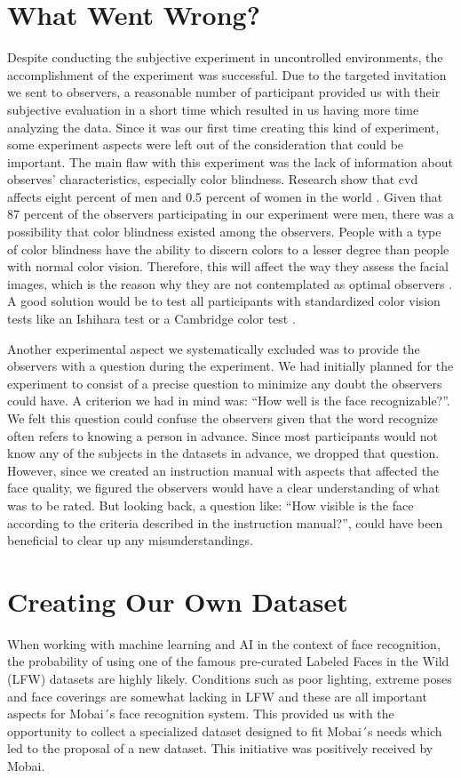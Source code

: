 \section{What Went Wrong?}
Despite conducting the subjective experiment in uncontrolled environments, the accomplishment of the experiment was successful. Due to the targeted invitation we sent to observers, a reasonable number of participant provided us with their subjective evaluation in a short time which resulted in us having more time analyzing the data. Since it was our first time creating this kind of experiment, some experiment aspects were left out of the consideration that could be important. The main flaw with this experiment was the lack of information about observes' characteristics, especially color blindness. Research show that \acrfull{cvd} affects eight percent of men and 0.5 percent of women in the world \cite{colorblindness}. Given that 87 percent of the observers participating in our experiment were men, there was a possibility that color blindness existed among the observers. People with a type of color blindness have the ability to discern colors to a lesser degree than people with normal color vision. Therefore, this will affect the way they assess the facial images, which is the reason why they are not contemplated as optimal observers \cite{Xphdthesis}. A good solution would be to test all participants with standardized color vision tests like an Ishihara test \cite{Ishihara} or a Cambridge color test \cite{CambridgeColorTest}.   

Another experimental aspect we systematically excluded was to provide the observers with a question during the experiment. We had initially planned for the experiment to consist of a precise question to minimize any doubt the observers could have. A criterion we had in mind was: ``How well is the face recognizable?''. We felt this question could confuse the observers given that the word recognize often refers to knowing a person in advance. Since most participants would not know any of the subjects in the datasets in advance, we dropped that question. However, since we created an instruction manual with aspects that affected the face quality, we figured the observers would have a clear understanding of what was to be rated. But looking back, a question like: ``How visible is the face according to the criteria described in the instruction manual?'', could have been beneficial to clear up any misunderstandings.   

\section{Creating Our Own Dataset}
\label{sec:ownData}
When working with machine learning and AI in the context of face recognition, the probability of using one of the famous pre-curated Labeled Faces in the Wild (LFW) datasets are highly likely. Conditions such as poor lighting, extreme poses and face coverings are somewhat lacking in LFW and these are all important aspects for Mobai´s face recognition system. This provided us with the opportunity to collect a specialized dataset designed to fit Mobai´s needs which led to the proposal of a new dataset. This initiative was positively received by Mobai.

